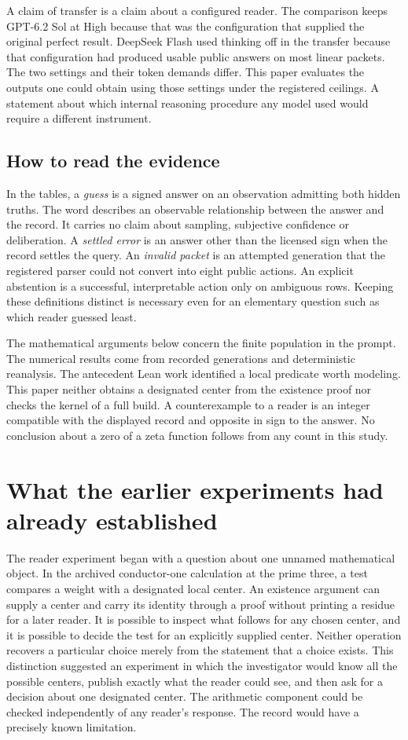 \documentclass[12pt,letterpaper]{article}
\begin{document}
A claim of transfer is a claim about a configured reader. The comparison keeps GPT-6.2 Sol at High because that was the configuration that supplied the original perfect result. DeepSeek Flash used thinking off in the transfer because that configuration had produced usable public answers on most linear packets. The two settings and their token demands differ. This paper evaluates the outputs one could obtain using those settings under the registered ceilings. A statement about which internal reasoning procedure any model used would require a different instrument.

\subsection{How to read the evidence}
In the tables, a \emph{guess} is a signed answer on an observation admitting both hidden truths. The word describes an observable relationship between the answer and the record. It carries no claim about sampling, subjective confidence or deliberation. A \emph{settled error} is an answer other than the licensed sign when the record settles the query. An \emph{invalid packet} is an attempted generation that the registered parser could not convert into eight public actions. An explicit abstention is a successful, interpretable action only on ambiguous rows. Keeping these definitions distinct is necessary even for an elementary question such as which reader guessed least.

The mathematical arguments below concern the finite population in the prompt. The numerical results come from recorded generations and deterministic reanalysis. The antecedent Lean work identified a local predicate worth modeling. This paper neither obtains a designated center from the existence proof nor checks the kernel of a full build. A counterexample to a reader is an integer compatible with the displayed record and opposite in sign to the answer. No conclusion about a zero of a zeta function follows from any count in this study.

\section{What the earlier experiments had already established}
\label{sec:historical-reader}

The reader experiment began with a question about one unnamed mathematical object. In the archived conductor-one calculation at the prime three, a test compares a weight with a designated local center. An existence argument can supply a center and carry its identity through a proof without printing a residue for a later reader. It is possible to inspect what follows for any chosen center, and it is possible to decide the test for an explicitly supplied center. Neither operation recovers a particular choice merely from the statement that a choice exists. This distinction suggested an experiment in which the investigator would know all the possible centers, publish exactly what the reader could see, and then ask for a decision about one designated center. The arithmetic component could be checked independently of any reader's response. The record would have a precisely known limitation.
\end{document}
